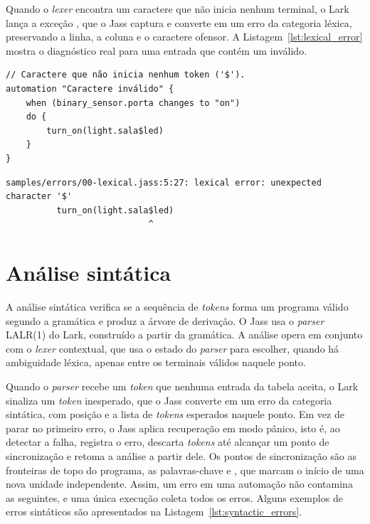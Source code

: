 \documentclass[12pt]{article}
\renewcommand\texttt[1]{\svtt{\small#1}}
\begin{document}
Quando o \emph{lexer} encontra um caractere que
não inicia nenhum terminal, o Lark lança a exceção
\texttt{UnexpectedCharacters}, que o Jass captura e
converte em um erro da categoria léxica, preservando a linha, a coluna e o caractere ofensor.
A Listagem~\ref{lst:lexical_error} mostra o
diagnóstico real para uma entrada que contém um \texttt{\$} inválido.

\begin{listing}[H]
    \centering
    \begin{verbatim}
// Caractere que não inicia nenhum token ('$').
automation "Caractere inválido" {
    when (binary_sensor.porta changes to "on")
    do {
        turn_on(light.sala$led)
    }
}
    \end{verbatim}
    \begin{verbatim}
samples/errors/00-lexical.jass:5:27: lexical error: unexpected character '$'
          turn_on(light.sala$led)
                            ^
    \end{verbatim}
    \caption{Demonstração de erro léxico.}
    \label{lst:lexical_error}
\end{listing}







\section{Análise sintática}

A análise sintática verifica se a sequência de \emph{tokens} forma um
programa válido segundo a gramática e produz a árvore de
derivação. O Jass usa o \emph{parser} LALR(1) do Lark, construído
a partir da gramática. A análise opera em conjunto com o \textit{lexer} contextual,
que usa o estado do \emph{parser} para escolher, quando há ambiguidade
léxica, apenas entre os terminais válidos naquele ponto.


Quando o \emph{parser} recebe um \emph{token} que nenhuma entrada da
tabela aceita, o Lark sinaliza um \emph{token} inesperado, que o
Jass converte em um erro da categoria sintática, com posição e
a lista de \emph{tokens} esperados naquele ponto. Em vez de
parar no primeiro erro, o Jass aplica
recuperação em modo pânico, isto é, ao detectar a falha, registra o
erro, descarta \emph{tokens} até alcançar um ponto de
sincronização e retoma a análise a partir dele. Os pontos de
sincronização são as fronteiras de topo do programa, as
palavras-chave \texttt{automation} e \texttt{def}, que marcam o
início de uma nova unidade independente. Assim, um erro em uma automação
não contamina as seguintes, e uma única execução coleta todos
os erros. Alguns exemplos de erros sintáticos são apresentados na Listagem~\ref{lst:syntactic_errors}.
\end{document}
